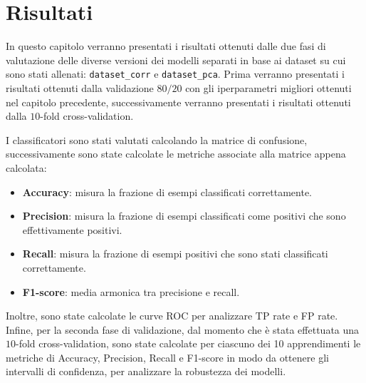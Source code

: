 \chapter{Risultati} \label{chp:risultati}
In questo capitolo verranno presentati i risultati ottenuti dalle due fasi di
valutazione delle diverse versioni dei modelli separati in base ai dataset su
cui sono stati allenati: \texttt{dataset\_corr} e \texttt{dataset\_pca}. Prima
verranno presentati i risultati ottenuti dalla validazione $80/20$ con gli
iperparametri migliori ottenuti nel capitolo precedente, successivamente verranno
presentati i risultati ottenuti dalla $10$-fold cross-validation.



I classificatori sono stati valutati calcolando la matrice di confusione,
successivamente sono state calcolate le metriche associate alla matrice appena
calcolata:
\begin{itemize}
    \item \textbf{Accuracy}: misura la frazione di esempi classificati correttamente.
    \item \textbf{Precision}: misura la frazione di esempi classificati come
          positivi che sono effettivamente positivi.
    \item \textbf{Recall}: misura la frazione di esempi positivi che sono stati
          classificati correttamente.
    \item \textbf{F1-score}: media armonica tra precisione e recall.
\end{itemize}
Inoltre, sono state calcolate le curve ROC per analizzare TP rate e FP rate.
Infine, per la seconda fase di validazione, dal momento che è stata effettuata una
$10$-fold cross-validation, sono state calcolate per ciascuno dei 10 apprendimenti
le metriche di Accuracy, Precision, Recall e F1-score in modo da ottenere gli
intervalli di confidenza, per analizzare la robustezza dei modelli.

